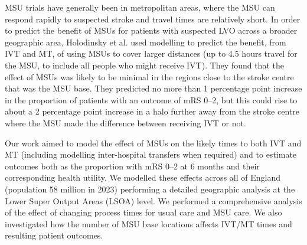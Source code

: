 
MSU trials have generally been in metropolitan areas, where the MSU can respond rapidly to suspected stroke and travel times are relatively short. In order to predict the benefit of MSUs for patients with suspected LVO across a broader geographic area, Holodinsky et al. \cite{holodinsky_jessalyn_k_what_2020} used modelling to predict the benefit, from IVT and MT, of using MSUs to cover larger distances (up to 4.5 hours travel for the MSU, to include all people who might receive IVT). They found that the effect of MSUs was likely to be minimal in the regions close to the stroke centre that was the MSU base. They predicted no more than 1 percentage point increase in the proportion of patients with an outcome of mRS 0--2, but this could rise to about a 2 percentage point increase in a halo further away from the stroke centre where the MSU made the difference between receiving IVT or not.


Our work aimed to model the effect of MSUs on the likely times to both IVT and MT (including modelling inter-hospital transfers when required) and to estimate outcomes both as the proportion with mRS 0--2 at 6 months and their corresponding health utility. We modelled these effects across  all of England (population 58 million in 2023) performing a detailed geographic analysis at the Lower Super Output Areas (LSOA) level. We performed a comprehensive analysis of the effect of changing process times for usual care and MSU care. We also investigated how the number of MSU base locations affects IVT/MT times and resulting patient outcomes.